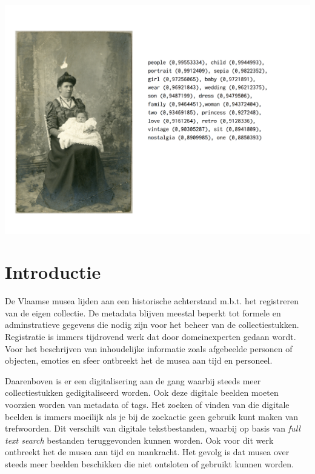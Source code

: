 \documentclass[a0,portrait]{a0poster}
\begin{document}
\begin{multicols}{2}
\begin{center}
    \includegraphics[width=1.0\linewidth]{clarifai}
\end{center}\vspace{1cm}


\color{HoGentAccent1} 
\section*{Introductie}
\color{black}
De Vlaamse musea lijden aan een historische achterstand m.b.t. het registreren van de eigen collectie. De metadata blijven meestal beperkt tot formele en adminstratieve gegevens die nodig zijn voor het beheer van de collectiestukken. Registratie is immers tijdrovend werk dat door domeinexperten gedaan wordt. Voor het beschrijven van inhoudelijke informatie zoals afgebeelde personen of objecten, emoties en sfeer ontbreekt het de musea aan tijd en personeel.

Daarenboven is er een digitalisering aan de gang waarbij steeds meer collectiestukken gedigitaliseerd worden. Ook deze digitale beelden moeten voorzien worden van metadata of tags. Het zoeken of vinden van die digitale beelden is immers moeilijk als je bij de zoekactie geen gebruik kunt maken van trefwoorden. Dit verschilt van digitale tekstbestanden, waarbij op basis van \textit{full text search} bestanden teruggevonden kunnen worden. Ook voor dit werk ontbreekt het de musea aan tijd en mankracht. Het gevolg is dat musea over steeds meer beelden beschikken die niet ontsloten of gebruikt kunnen worden. 


\end{multicols}
\end{document}
